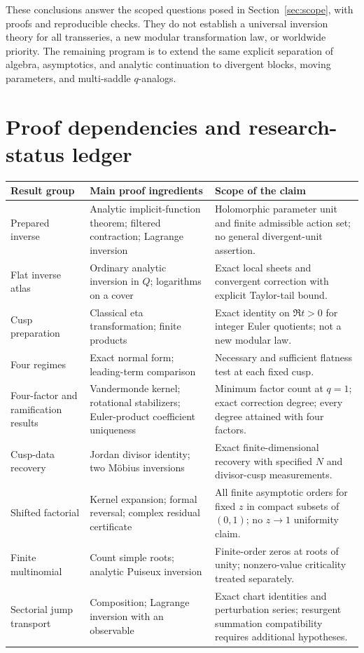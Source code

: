 \documentclass[11pt,a4paper]{article}
\numberwithin{equation}{section}
\theoremstyle{definition}\newtheorem{definition}[theorem]{Definition}
\theoremstyle{remark}\newtheorem{remark}[theorem]{Remark}
\begin{document}
These conclusions answer the scoped questions posed in
Section~\ref{sec:scope}, with proofs and reproducible checks. They do
not establish a universal inversion theory for all transseries, a new
modular transformation law, or worldwide priority. The remaining program
is to extend the same explicit separation of algebra, asymptotics,
and analytic continuation to divergent blocks, moving parameters,
and multi-saddle $q$-analogs.

\clearpage
\appendix
\section{Proof dependencies and research-status ledger}
\label{app:ledger}
\begin{longtable}{@{}>{\raggedright\arraybackslash}p{}>{\raggedright\arraybackslash}p{}>{\raggedright\arraybackslash}p{}@{}}
\toprule
Result group & Main proof ingredients & Scope of the claim\\
\midrule
\endhead
Prepared inverse & Analytic implicit-function theorem; filtered
contraction; Lagrange inversion & Holomorphic parameter unit and finite
admissible action set; no general divergent-unit assertion.\\[4pt]
Flat inverse atlas & Ordinary analytic inversion in $Q$; logarithms on
a cover & Exact local sheets and convergent correction with explicit
Taylor-tail bound.\\[4pt]
Cusp preparation & Classical eta transformation; finite products & Exact
identity on $\Re t>0$ for integer Euler quotients; not a new modular law.\\[4pt]
Four regimes & Exact normal form; leading-term comparison & Necessary
and sufficient flatness test at each fixed cusp.\\[4pt]
Four-factor and ramification results & Vandermonde kernel; rotational
stabilizers; Euler-product coefficient uniqueness & Minimum factor count
at $q=1$; exact correction degree; every degree attained with four factors.\\[4pt]
Cusp-data recovery & Jordan divisor identity; two M\"obius inversions &
Exact finite-dimensional recovery with specified $N$ and divisor-cusp
measurements.\\[4pt]
Shifted factorial & Kernel expansion; formal reversal; complex residual
certificate & All finite asymptotic orders for fixed $z$ in compact
subsets of $(0,1)$; no $z\to1$ uniformity claim.\\[4pt]
Finite multinomial & Count simple roots; analytic Puiseux inversion &
Finite-order zeros at roots of unity; nonzero-value criticality treated
separately.\\[4pt]
Sectorial jump transport & Composition; Lagrange inversion with an
observable & Exact chart identities and perturbation series; resurgent
summation compatibility requires additional hypotheses.\\
\bottomrule
\end{longtable}
\end{document}
